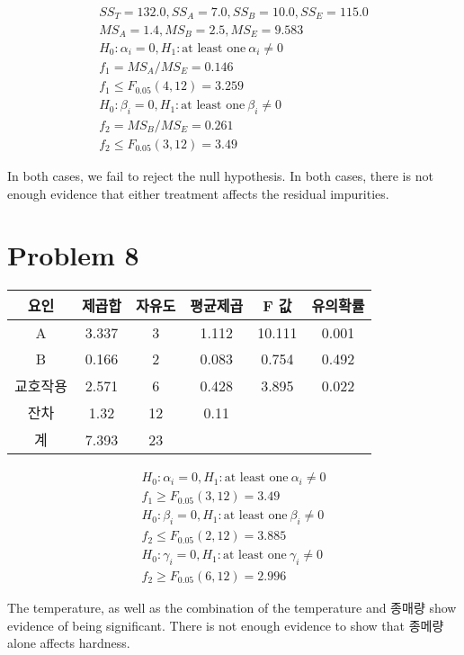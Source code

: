 \documentclass{article}
\begin{document}
\begin{gather*}
	SS_T = 132.0, SS_A = 7.0, SS_B = 10.0, SS_E = 115.0 \\
	MS_A = 1.4, MS_B = 2.5, MS_E = 9.583 \\
	H_0: \alpha_i = 0, H_1: \text{at least one}\ \alpha_i \ne 0 \\
	f_1 = MS_A / MS_E = 0.146 \\
	f_1 \le F_{0.05}(4, 12) = 3.259 \\
	H_0: \beta_i = 0, H_1: \text{at least one}\ \beta_i \ne 0 \\
	f_2 = MS_B / MS_E = 0.261 \\
	f_2 \le F_{0.05}(3, 12) = 3.49
\end{gather*}

In both cases, we fail to reject the null hypothesis. In both cases, there is
not enough evidence that either treatment affects the residual impurities.

\section*{Problem 8}

\begin{center}
\begin{tabular}{c|ccccc}
	요인 & 제곱합 & 자유도 & 평균제곱 & F 값 & 유의확률 \\
	\hline
	A        & 3.337 & 3 & 1.112 & 10.111 & 0.001 \\
	B        & 0.166 & 2 & 0.083 &  0.754 & 0.492 \\
	교호작용 & 2.571 & 6 & 0.428 &  3.895 & 0.022 \\
	잔차     &  1.32 & 12 & 0.11 \\
	\hline
	계       & 7.393 & 23
\end{tabular}
\end{center}
\begin{gather*}
	H_0: \alpha_i = 0, H_1: \text{at least one}\ \alpha_i \ne 0 \\
	f_1 \ge F_{0.05}(3, 12) = 3.49 \\
	H_0: \beta_i = 0, H_1: \text{at least one}\ \beta_i \ne 0 \\
	f_2 \le F_{0.05}(2, 12) = 3.885 \\
	H_0: \gamma_i = 0, H_1: \text{at least one}\ \gamma_i \ne 0 \\
	f_2 \ge F_{0.05}(6, 12) = 2.996
\end{gather*}

The temperature, as well as the combination of the temperature and 종매량 show
evidence of being significant. There is not enough evidence to show that 종메량
alone affects hardness.
\end{document}
